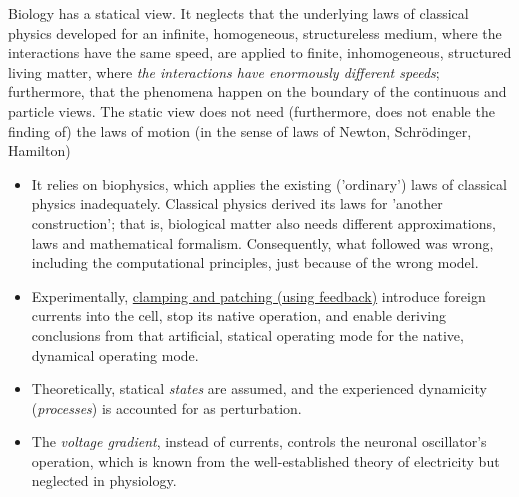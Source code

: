 Biology has a statical view. It neglects that the underlying laws of classical physics developed for an infinite, homogeneous, structureless medium, where the interactions have the same speed, are applied
 to finite, inhomogeneous, structured living matter, where \textit{the interactions have enormously different speeds}; furthermore, that the phenomena happen on the boundary of the continuous and particle views.
 The static view does not need (furthermore, does not enable the finding of) the laws of motion (in the sense of laws of Newton, Schrödinger, Hamilton)
 \begin{itemize}
 \item It relies on biophysics, which applies
the existing ('ordinary') laws of classical physics inadequately. Classical physics derived its laws for 'another construction'; 
that is, biological matter also needs different approximations, laws and mathematical 
formalism. Consequently, what followed was wrong, including the computational principles, just because of the wrong model. 

 \item Experimentally, \hyperlink{voltage-clamping}{clamping and patching (using feedback)} introduce foreign currents into the cell, stop its native operation, and enable deriving conclusions from that artificial, statical operating mode for the native, dynamical operating mode. 
 \item Theoretically, statical \textit{states} are assumed, and the experienced dynamicity (\textit{processes}) is accounted for as perturbation. 
 \item The \textit{voltage gradient}, instead of currents, controls the neuronal oscillator's operation, which is known from the well-established theory of electricity but neglected in physiology. 
  \end{itemize}

